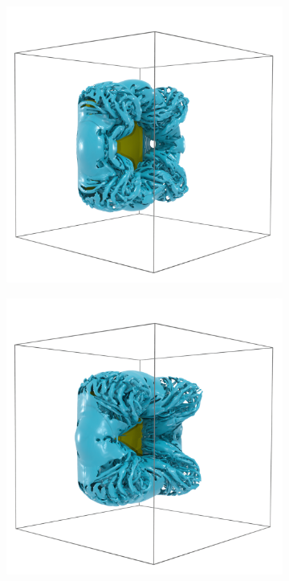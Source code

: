 \documentclass{article}
\begin{document}
\begin{figure}
\begin{subfigure}{.33\textwidth}
    \end{subfigure}%
    \begin{subfigure}{.33\textwidth}
        \centering
        \includegraphics[width=\textwidth]{tex/fig/disk_high_re_6.png}
    \end{subfigure}%
    \begin{subfigure}{.33\textwidth}
        \centering
        \includegraphics[width=\textwidth]{tex/fig/disk_high_re_7.png}

\end{subfigure}
\end{figure}
\end{document}
